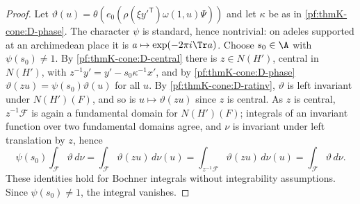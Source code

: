 \begin{proof}
Let $\vartheta(u)=\theta(e_0(\rho(\xi y'^{\mathsf T})\omega(1,u)\Psi))$ and let $\kappa$ be as in
\ref{pf:thmK-cone:D-phase}.  The character $\psi$ is standard, hence nontrivial: on adeles supported at an archimedean
place it is $a\mapsto\exp(-2\pi i\Tr a)$.  Choose $s_0\in\A$ with $\psi(s_0)\neq1$.  By \ref{pf:thmK-cone:D-central}
there is $z\in N(H')$, central in $N(H')$, with $z^{-1}y'=y'-s_0\kappa^{-1}x'$, and by \ref{pf:thmK-cone:D-phase}
$\vartheta(zu)=\psi(s_0)\vartheta(u)$ for all $u$.  By \ref{pf:thmK-cone:D-ratinv}, $\vartheta$ is left invariant under
$N(H')(F)$, and so is $u\mapsto\vartheta(zu)$ since $z$ is central.  As $z$ is central, $z^{-1}\mathcal F$ is again a
fundamental domain for $N(H')(F)$; integrals of an invariant function over two fundamental domains agree, and $\nu$ is
invariant under left translation by $z$, hence
\[
  \psi(s_0)\int_{\mathcal F}\vartheta\,d\nu=\int_{\mathcal F}\vartheta(zu)\,d\nu(u)
  =\int_{z^{-1}\mathcal F}\vartheta(zu)\,d\nu(u)=\int_{\mathcal F}\vartheta\,d\nu .
\]
These identities hold for Bochner integrals without integrability assumptions.  Since $\psi(s_0)\neq1$, the integral
vanishes.
\end{proof}

